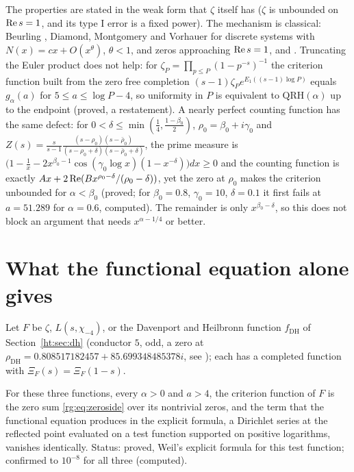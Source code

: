 The properties are stated in the weak form that $\zeta$ itself has ($\zeta$ is unbounded on $\operatorname{Re} s=1$, and its type I error is a fixed power). The mechanism is classical: Beurling \cite{NCBeurling37}, Diamond, Montgomery and Vorhauer \cite{NCDMV06} for discrete systems with $N(x)=cx+O(x^\theta)$, $\theta<1$, and zeros approaching $\operatorname{Re} s=1$, and \cite{Zhang07,BDV20,NCDiamondZhang16}. Truncating the Euler product does not help: for $\zeta_P=\prod_{p\le P}(1-p^{-s})^{-1}$ the criterion function built from the zero free completion $(s-1)\zeta_Pe^{E_1((s-1)\log P)}$ equals $g_\alpha(a)$ for $5\le a\le\log P-4$, so uniformity in $P$ is equivalent to $\mathrm{QRH}(\alpha)$ up to the endpoint (proved, a restatement). A nearly perfect counting function has the same defect: for $0<\delta\le\min(\frac14,\frac{1-\beta_0}2)$, $\rho_0=\beta_0+i\gamma_0$ and $Z(s)=\frac s{s-1}\frac{(s-\rho_0)(s-\bar\rho_0)}{(s-\rho_0+\delta)(s-\bar\rho_0+\delta)}$, the prime measure is $\big(1-\frac1x-2x^{\beta_0-1}\cos(\gamma_0\log x)(1-x^{-\delta})\big)dx\ge0$ and the counting function is exactly $Ax+2\operatorname{Re}(Bx^{\rho_0-\delta}/(\rho_0-\delta))$, yet the zero at $\rho_0$ makes the criterion unbounded for $\alpha<\beta_0$ (proved; for $\beta_0=0.8$, $\gamma_0=10$, $\delta=0.1$ it first fails at $a=51.289$ for $\alpha=0.6$, computed). The remainder is only $x^{\beta_0-\delta}$, so this does not block an argument that needs $x^{\alpha-1/4}$ or better.

\section{What the functional equation alone gives}\label{rg:sec:fe}

Let $F$ be $\zeta$, $L(s,\chi_{-4})$, or the Davenport and Heilbronn function $f_{\mathrm{DH}}$ of Section~\ref{ht:sec:dh} (conductor $5$, odd, a zero at $\rho_{\mathrm{DH}}=0.808517182457+85.699348485378i$, see \cite{DH36,BSO07}); each has a completed function with $\Xi_F(s)=\Xi_F(1-s)$.

\begin{proposition}\label{rg:prop:empty}
For these three functions, every $\alpha>0$ and $a>4$, the criterion function of $F$ is the zero sum \eqref{rg:eq:zeroside} over its nontrivial zeros, and the term that the functional equation produces in the explicit formula, a Dirichlet series at the reflected point evaluated on a test function supported on positive logarithms, vanishes identically. Status: proved, Weil's explicit formula \cite{Weil52,IwaniecKowalski04} for this test function; confirmed to $10^{-8}$ for all three (computed).
\end{proposition}

